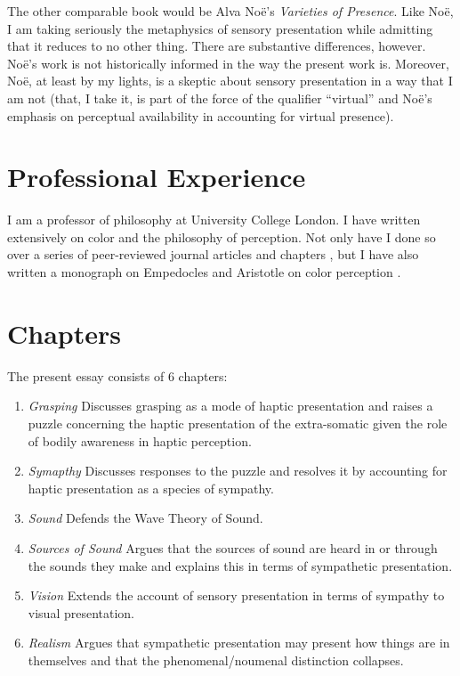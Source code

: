 \documentclass[12pt]{article}
\begin{document}
The other comparable book would be Alva No\"{e}'s \emph{Varieties of Presence}. Like No\"{e}, I am taking seriously the metaphysics of sensory presentation while admitting that it reduces to no other thing. There are substantive differences, however. No\"{e}'s work is not historically informed in the way the present work is. Moreover, No\"{e}, at least by my lights, is a skeptic about sensory presentation in a way that I am not (that, I take it, is part of the force of the qualifier ``virtual'' and No\"{e}'s emphasis on perceptual availability in accounting for virtual presence).


\section{Professional Experience} %
\label{sec:professional_experience}

I am a professor of philosophy at University College London. I have written extensively on color and the philosophy of perception. Not only have I done so over a series of peer-reviewed journal articles and chapters \citep{Hilbert:2000on,Kalderon:2006tg,Kalderon:2008fk,Kalderon:2007mr,Kalderon:2010fj,Kalderon:2010fk,Kalderon:2011fk,Kalderon:2012fk}, but I have also written a monograph on Empedocles and Aristotle on color perception \citep{Kalderon:2015fr}.


\section{Chapters} %
\label{sec:chapters}

The present essay consists of 6 chapters:

\begin{enumerate}
	\item \emph{Grasping} Discusses grasping as a mode of haptic presentation and raises a puzzle concerning the haptic presentation of the extra-somatic given the role of bodily awareness in haptic perception.
	\item \emph{Symapthy} Discusses responses to the puzzle and resolves it by accounting for haptic presentation as a species of sympathy.
	\item \emph{Sound} Defends the Wave Theory of Sound.
	\item \emph{Sources of Sound} Argues that the sources of sound are heard in or through the sounds they make and explains this in terms of sympathetic presentation.
	\item \emph{Vision} Extends the account of sensory presentation in terms of sympathy to visual presentation.
	\item \emph{Realism} Argues that sympathetic presentation may present how things are in themselves and that the phenomenal/noumenal distinction collapses.
\end{enumerate}
\end{document}
